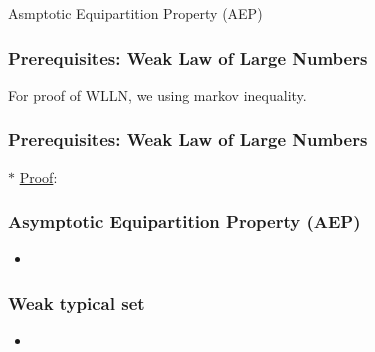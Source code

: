 \documentclass[9pt]{beamer}
\begin{document}
    \begin{section}{Asmptotic Equipartition Property (AEP)}
        \begin{frame}
            \frametitle{Prerequisites: Weak Law of Large Numbers}
            \begin{theorem}
                
            \end{theorem}
            For proof of WLLN, we using markov inequality.
            \begin{theorem}
                
            \end{theorem}
            
        
        \end{frame}
        
        \begin{frame}
            \frametitle{Prerequisites: Weak Law of Large Numbers}
            $\ast$ \underline{Proof}:
            
        \end{frame}

        \begin{frame}
            \frametitle{Asymptotic Equipartition Property (AEP)}
            \begin{theorem}
                
            \end{theorem}
            \begin{itemize}
                \item 
            \end{itemize}
    
        
        \end{frame}

        \begin{frame}
            \frametitle{Weak typical set}
            \begin{definition}
                
            \end{definition}
            \begin{itemize}
                \item 
            \end{itemize}
        
        \end{frame}   


\end{section}
\end{document}
